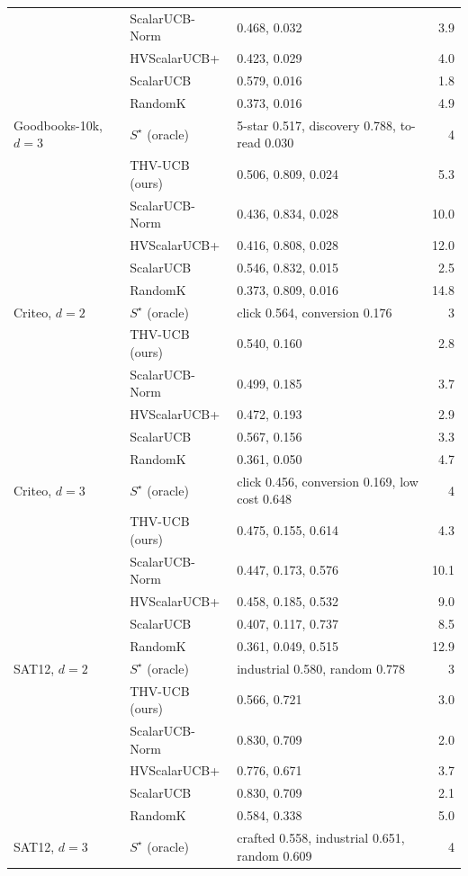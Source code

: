 \begin{tabular}{ll l r}
 & ScalarUCB-Norm & 0.468, 0.032 & 3.9\\
 & HVScalarUCB+ & 0.423, 0.029 & 4.0\\
 & ScalarUCB & 0.579, 0.016 & 1.8\\
 & RandomK & 0.373, 0.016 & 4.9\\
\midrule
Goodbooks-10k, $d=3$ & $S^\star$ (oracle) & 5-star 0.517, discovery 0.788, to-read 0.030 & 4\\
 & THV-UCB (ours) & 0.506, 0.809, 0.024 & 5.3\\
 & ScalarUCB-Norm & 0.436, 0.834, 0.028 & 10.0\\
 & HVScalarUCB+ & 0.416, 0.808, 0.028 & 12.0\\
 & ScalarUCB & 0.546, 0.832, 0.015 & 2.5\\
 & RandomK & 0.373, 0.809, 0.016 & 14.8\\
\midrule
Criteo, $d=2$ & $S^\star$ (oracle) & click 0.564, conversion 0.176 & 3\\
 & THV-UCB (ours) & 0.540, 0.160 & 2.8\\
 & ScalarUCB-Norm & 0.499, 0.185 & 3.7\\
 & HVScalarUCB+ & 0.472, 0.193 & 2.9\\
 & ScalarUCB & 0.567, 0.156 & 3.3\\
 & RandomK & 0.361, 0.050 & 4.7\\
\midrule
Criteo, $d=3$ & $S^\star$ (oracle) & click 0.456, conversion 0.169, low cost 0.648 & 4\\
 & THV-UCB (ours) & 0.475, 0.155, 0.614 & 4.3\\
 & ScalarUCB-Norm & 0.447, 0.173, 0.576 & 10.1\\
 & HVScalarUCB+ & 0.458, 0.185, 0.532 & 9.0\\
 & ScalarUCB & 0.407, 0.117, 0.737 & 8.5\\
 & RandomK & 0.361, 0.049, 0.515 & 12.9\\
\midrule
SAT12, $d=2$ & $S^\star$ (oracle) & industrial 0.580, random 0.778 & 3\\
 & THV-UCB (ours) & 0.566, 0.721 & 3.0\\
 & ScalarUCB-Norm & 0.830, 0.709 & 2.0\\
 & HVScalarUCB+ & 0.776, 0.671 & 3.7\\
 & ScalarUCB & 0.830, 0.709 & 2.1\\
 & RandomK & 0.584, 0.338 & 5.0\\
\midrule
SAT12, $d=3$ & $S^\star$ (oracle) & crafted 0.558, industrial 0.651, random 0.609 & 4\\

\end{tabular}
